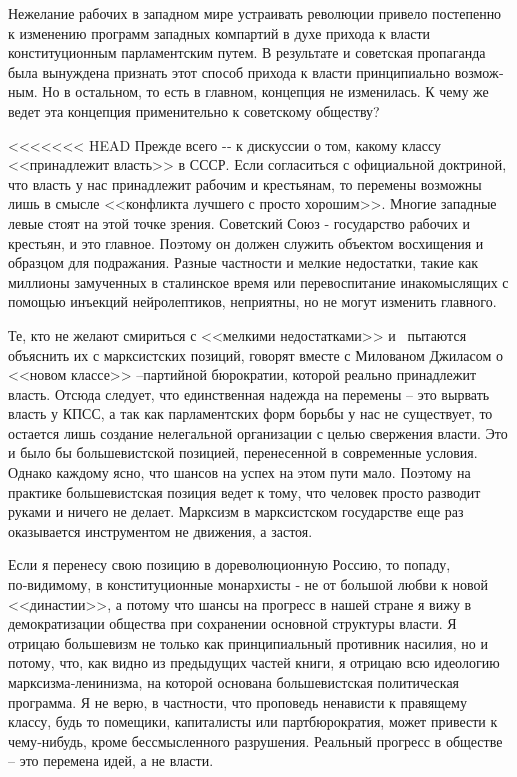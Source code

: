 \documentclass{book}
\begin{document}
Нежелание рабочих в западном мире устраивать революции привело постепенно к изменению программ западных компар­тий в духе прихода к власти конституционным парламентским путем. В результате и советская пропаганда была вынуждена признать этот способ прихода к власти принципиально возмож­ным. Но в остальном, то есть в главном, концепция не измени­лась. К чему же ведет эта концепция применительно к советско­му обществу?

<<<<<<< HEAD
Прежде всего -‑ к дискуссии о том, какому классу <<принад­лежит власть>> в СССР. Если согласиться с официальной доктри­ной, что власть у нас принадлежит рабочим и крестьянам, то перемены возможны лишь в смысле <<конфликта лучшего с просто хорошим>>. Многие западные левые стоят на этой точке зрения. Советский Союз ‑ государство рабочих и крестьян, и это главное. Поэтому он должен служить объектом восхищения и образцом для подражания. Разные частности и мелкие недо­статки, такие как миллионы замученных в сталинское время или перевоспитание инакомыслящих с помощью инъекций нейролептиков, неприятны, но не могут изменить главного.

Те, кто не желают смириться с <<мелкими недостатками>> и  пытаются объяснить их с марксистских позиций, говорят вместе с Милованом Джиласом о <<новом классе>> --партийной бюрократии, которой реально принадлежит власть. Отсюда следует, что единственная надежда на перемены -- это вырвать власть у КПСС, а так как парламентских форм борьбы у нас не существует, то остается лишь создание нелегальной организации с целью свержения власти. Это и было бы большевистской позицией, перенесенной в современные условия. Однако каждому ясно, что шансов на успех на этом пути мало. Поэтому на практике большевистская позиция ведет к тому, что человек просто разводит руками и ничего не делает. Марксизм в марксистском государстве еще раз оказывается инструментом не движения, а застоя.

Если я перенесу свою позицию в дореволюционную Россию, то попаду, по‑видимому, в конституционные монархисты ‑ не от большой любви к новой <<династии>>, а потому что шансы на прогресс в нашей стране я вижу в демократизации общества при сохранении основной структуры власти. Я отрицаю больше­визм не только как принципиальный противник насилия, но и потому, что, как видно из предыдущих частей книги, я отрицаю всю идеологию марксизма‑ленинизма, на которой основана большевистская политическая программа. Я не верю, в частно­сти, что проповедь ненависти к правящему классу, будь то поме­щики, капиталисты или партбюрократия, может привести к че­му‑нибудь, кроме бессмысленного разрушения. Реальный про­гресс в обществе -- это перемена идей, а не власти.
\end{document}
